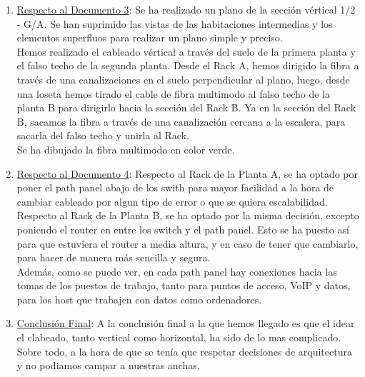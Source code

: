 \documentclass[]{article}
\begin{document}
\begin{enumerate}[label=\alph*]
        Para las etiquetas, hemos realizado una codificación simple, separando solamente las etiquetas correspondientes a los puntos de acceso. Dicha codificación será:
        \begin{center} (tipo de conector) (etiq distribuidor) (número de conexión)\end{center}
        \begin{center}Ejemplo: RJA4 (conexión 4, planta superior datos / VoIP)\end{center}
        Para el routing, utilizaremos solo un router en el Rack B (Planta Baja). Esto es debido a que no es necesario amplificar la señal de las conexiones mas lejanas, ya que, en ningún caso superara los 100 metros.

   \item \underline{Respecto al Documento 3}: Se ha realizado un plano de la sección vértical 1/2 - G/A. Se han suprimido las vistas de las habitaciones intermedias y los elementos superfluos para realizar un plano simple y preciso. \\
       Hemos realizado el cableado vértical a través del suelo de la primera planta y el falso techo de la segunda planta. Desde el Rack A, hemos dirigido la fibra a través de una canalizaciones en el suelo perpendicular al plano, luego, desde una loseta hemos tirado el cable de fibra multimodo al falso techo de la planta B para dirigirlo hacia la sección del Rack B. Ya en la sección del Rack B, sacamos la fibra a través de una canalización cercana a la escalera, para sacarla del falso techo y unirla al Rack. \\
       Se ha dibujado la fibra multimodo en color verde.
   \item \underline{Respecto al Documento 4}: Respecto al Rack de la Planta A, se ha optado por poner el path panel abajo de los swith para mayor facilidad a la hora de cambiar cableado por algun tipo de error o que se quiera escalabilidad. \\
       Respecto al Rack de la Planta B, se ha optado por la misma decisión, excepto poniendo el router en entre los switch y el path panel. Esto se ha puesto así para que estuviera el router a media altura, y en caso de tener que cambiarlo, para hacer de manera más sencilla y segura. \\
       Además, como se puede ver, en cada path panel hay conexiones hacia las tomas de los puestos de trabajo, tanto para puntos de acceso, VoIP y datos, para los host que trabajen con datos como ordenadores.
   \item \underline{Conclusión Final}: A la conclusión final a la que hemos llegado es que el idear el clabeado, tanto vertical como horizontal, ha sido de lo mas complicado. Sobre todo, a la hora de que se tenía que respetar decisiones de arquitectura y no podiamos campar a nuestras anchas.\\

\end{enumerate}
\end{document}
